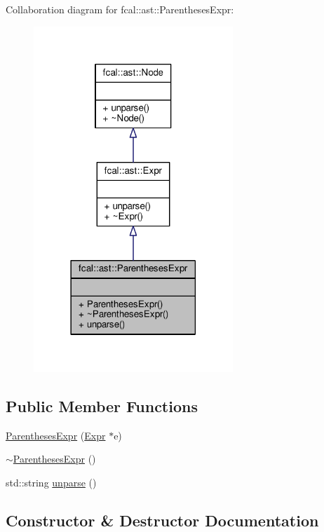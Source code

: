 Collaboration diagram for fcal\+:\+:ast\+:\+:Parentheses\+Expr\+:
\nopagebreak
\begin{figure}[H]
\begin{center}
\leavevmode
\includegraphics[width=213pt]{classfcal_1_1ast_1_1ParenthesesExpr__coll__graph}
\end{center}
\end{figure}
\subsection*{Public Member Functions}
\begin{DoxyCompactItemize}
\item 
\hyperlink{classfcal_1_1ast_1_1ParenthesesExpr_a02e380aba4039f13ac7227302cfb1d7e}{Parentheses\+Expr} (\hyperlink{classfcal_1_1ast_1_1Expr}{Expr} $\ast$e)
\item 
\hyperlink{classfcal_1_1ast_1_1ParenthesesExpr_afc50f5f01aad502a04cd1e01ddfeb8e9}{$\sim$\+Parentheses\+Expr} ()
\item 
std\+::string \hyperlink{classfcal_1_1ast_1_1ParenthesesExpr_aeeecf677f1f0e03771004cb611347732}{unparse} ()
\end{DoxyCompactItemize}


\subsection{Constructor \& Destructor Documentation}
